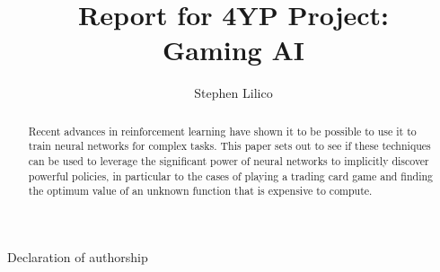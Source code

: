 \documentclass[twoside,12pt]{article}
\title{Report for 4YP Project: \\ Gaming AI}
\author{Stephen Lilico}
\begin{document}
  \maketitle
  
  \newpage
  Declaration of authorship
  \newpage
  \begin{abstract}
	Recent advances in reinforcement learning have shown it to be possible to use it to train neural networks for complex tasks. This paper sets out to see if these techniques can be used to leverage the significant power of neural networks to implicitly discover powerful policies, in particular to the cases of playing a trading card game and finding the optimum value of an unknown function that is expensive to compute.
	
  \end{abstract}
  \tableofcontents 
  
  
  
  
  
  
  
  
  
  
  
\end{document}
